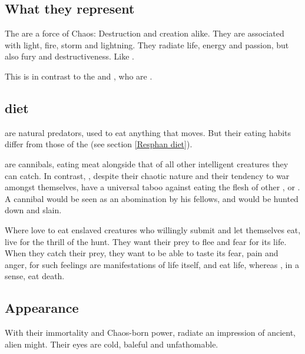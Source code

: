 \subsection{What they represent}
\label{Dragons radiate life}
The \dragons{} are a force of Chaos: Destruction and creation alike. They are associated with light, fire, storm and lightning. They radiate life, energy and passion, but also fury and destructiveness. Like . 

This is in contrast to the \banes{} and \resphain, who are . 









\subsection{\Draconic{} diet}
\label{Draconic diet}
\label{Dragon diet}
\Dragons{} are natural predators, used to eat anything that moves. But their eating habits differ from those of the \resphain{} (see section \ref{Resphan diet}). 

\Resphain{} are cannibals, eating \resphan{} meat alongside that of all other intelligent creatures they can catch. In contrast, \dragons, despite their chaotic nature and their tendency to war amongst themselves, have a universal taboo against eating the flesh of other \dragons{}, \ophidians{} or \rachyth. A cannibal \dragon{} would be seen as an abomination by his fellows, and would be hunted down and slain. 

Where \resphain{} love to eat enslaved creatures who willingly submit and let themselves eat, \dragons{} live for the thrill of the hunt. They want their prey to flee and fear for its life. When they catch their prey, they want to be able to taste its fear, pain and anger, for such feelings are manifestations of life itself, and \dragons{} eat life, whereas \resphain, in a sense, eat death. 







\subsection{Appearance}
\label{Draconic appearance}
With their immortality and Chaos-born power, \dragons{} radiate an impression of ancient, alien might. Their \ophidian{} eyes are cold, baleful and unfathomable. 

